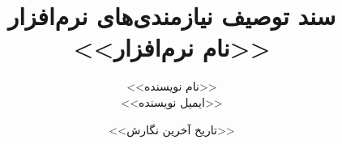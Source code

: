 \documentclass[12pt,fleqn,oneside]{book}
\begin{document}
\title{سند توصیف نیازمندی‌های نرم‌افزار \\ 
<<نام نرم‌افزار>>
}
\author{<<نام نویسنده>> \\
 <<ایمیل نویسنده>>}

\date{<<تاریخ آخرین نگارش>>}
\maketitle
\pagestyle{plain}
\clearpage
\tableofcontents
\clearpage
\listoffigures
\clearpage
{}









\end{document}
